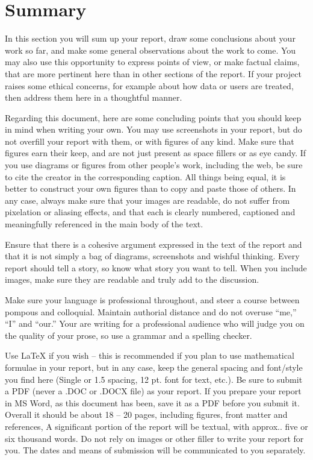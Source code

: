 \chapter{Summary}


In this section you will sum up your report, draw some conclusions about your work so far, and make some general observations about the work to come. You may also use this opportunity to express points of view, or make factual claims, that are more pertinent here than in other sections of the report. If your project raises some ethical concerns, for example about how data or users are treated, then address them here in a thoughtful manner.

Regarding this document, here are some concluding points that you should keep in mind when writing your own. You may use screenshots in your report, but do not overfill your report with them, or with figures of any kind. Make sure that figures earn their keep, and are not just present as space fillers or as eye candy. If you use diagrams or figures from other people’s work, including the web, be sure to cite the creator in the corresponding caption. All things being equal, it is better to construct your own figures than to copy and paste those of others. In any case, always make sure that your images are readable, do not suffer from pixelation or aliasing effects, and that each is clearly numbered, captioned and meaningfully referenced in the main body of the text.

Ensure that there is a cohesive argument expressed in the text of the report and that it is not simply a bag of diagrams, screenshots and wishful thinking. Every report should tell a story, so know what story you want to tell. When you include images, make sure they are readable and truly add to the discussion.

Make sure your language is professional throughout, and steer a course between pompous and colloquial. Maintain authorial distance and do not overuse “me,” “I” and “our.” Your are writing for a professional audience who will judge you on the quality of your prose, so use a grammar and a spelling checker.

Use LaTeX if you wish – this is recommended if you plan to use mathematical formulae in your report, but in any case, keep the general spacing and font/style you find here (Single or 1.5 spacing, 12 pt. font for text, etc.). Be sure to submit a PDF (never a .DOC or .DOCX file) as your report. If you prepare your report in MS Word, as this document has been, save it as a PDF before you submit it. Overall it should be about 18 – 20 pages, including figures, front matter and references, A significant portion of the report will be textual, with approx.. five or six thousand words. Do not rely on images or other filler to write your report for you.
The dates and means of submission will be communicated to you separately.
